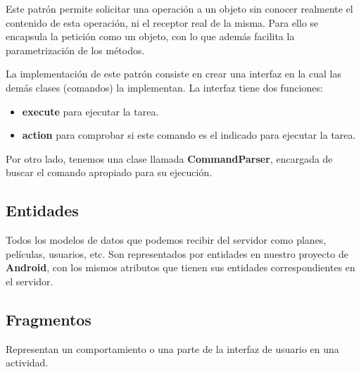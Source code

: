 Este patrón permite solicitar una operación a un objeto sin conocer realmente el contenido de esta operación, ni el receptor real de la misma. Para ello se encapsula la petición como un objeto, con lo que además facilita la parametrización de los métodos.

La implementación de este patrón consiste en crear una interfaz en la cual las demás clases (comandos) la implementan. La interfaz tiene dos funciones: 
\begin{itemize}
    \item  \textbf{execute} para ejecutar la tarea.
    \item  \textbf{action} para comprobar si este comando es el indicado para ejecutar la tarea. 
\end{itemize} 
Por otro lado, tenemos una clase llamada \textbf{CommandParser}, encargada de buscar el comando apropiado para su ejecución.

\subsection{Entidades}
\label{makereference4.3.4}
Todos los modelos de datos que podemos recibir del servidor como planes, películas, usuarios, etc. Son representados por entidades en nuestro proyecto de \textbf{Android}, con los mismos atributos que tienen sus entidades correspondientes en el servidor.

\subsection{Fragmentos}
\label{makereference4.3.5}
Representan un comportamiento o una parte de la interfaz de usuario en una actividad.

